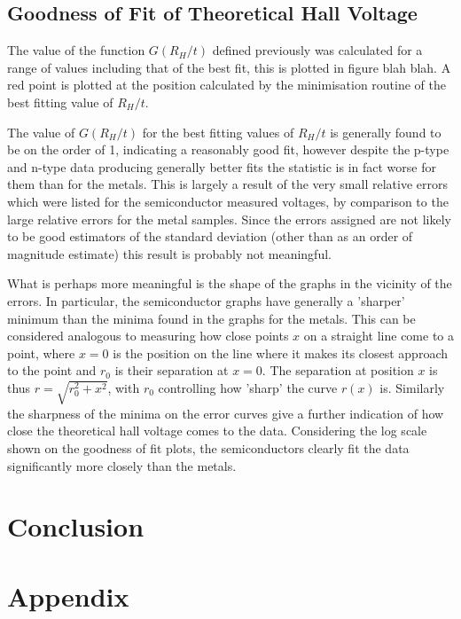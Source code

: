 \documentclass{article}
\begin{document}
		\subsection{Goodness of Fit of Theoretical Hall Voltage}
			The value of the function $G(R_H/t)$ defined previously was calculated for a range of values including that of the best fit, this is plotted in figure blah blah. A red point is plotted at the position calculated by the minimisation routine of the best fitting value of $R_H/t$.
			
			The value of $G(R_H/t)$ for the best fitting values of $R_H/t$ is generally found to be on the order of 1, indicating a reasonably good fit, however despite the p-type and n-type data producing generally better fits the statistic is in fact worse for them than for the metals. This is largely a result of the very small relative errors which were listed for the semiconductor measured voltages, by comparison to the large relative errors for the metal samples. Since the errors assigned are not likely to be good estimators of the standard deviation (other than as an order of magnitude estimate) this result is probably not meaningful.
			
			What is perhaps more meaningful is the shape of the graphs in the vicinity of the errors. In particular, the semiconductor graphs have generally a 'sharper' minimum than the minima found in the graphs for the metals. This can be considered analogous to measuring how close points $x$ on a straight line come to a point, where $x=0$ is the position on the line where it makes its closest approach to the point and $r_0$ is their separation at $x=0$. The separation at position $x$ is thus $r=\sqrt{r_0^2+x^2}$, with $r_0$ controlling how 'sharp' the curve $r(x)$ is. Similarly the sharpness of the minima on the error curves give a further indication of how close the theoretical hall voltage comes to the data. Considering the log scale shown on the goodness of fit plots, the semiconductors clearly fit the data significantly more closely than the metals.
	
	\section{Conclusion}
	
	
	\newpage
	\appendix
	\section{Appendix}
	
\end{document}
